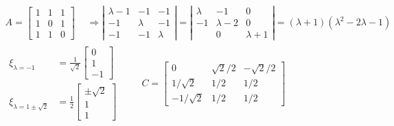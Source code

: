 \documentclass[twoside]{amsart}
\theoremstyle{plain}
\theoremstyle{definition}
\begin{document}
\[
\begin{gathered}
  A = \left[ \begin{matrix} 1 & 1 & 1 \\ 1 & 0 & 1 \\ 1 & 1 & 0 \end{matrix} \right] \quad \, \Longrightarrow \left| \begin{matrix} \lambda - 1 & -1 & -1 \\ -1 & \lambda & -1 \\ -1 & -1 & \lambda \end{matrix} \right| = \left| \begin{matrix} \lambda & -1 & 0 \\ -1 & \lambda - 2 & 0 \\ & 0 & \lambda + 1 \end{matrix} \right| = (\lambda + 1)(\lambda^2 - 2\lambda - 1) \\
  \begin{aligned}
    \xi_{\lambda = -1} & = \frac{1}{\sqrt{2}} \left[ \begin{matrix} 0 \\ 1 \\ -1 \end{matrix} \right] \\
    \xi_{\lambda = 1 \pm \sqrt{2}} & = \frac{1}{2} \left[ \begin{matrix} \pm \sqrt{2} \\ 1 \\ 1 \end{matrix} \right] 
  \end{aligned} \quad \quad \, 
  C = \left[ \begin{matrix} 0 & \sqrt{2}/2 & -\sqrt{2}/2 \\ 1/\sqrt{2} & 1/2 & 1/2 \\ -1/\sqrt{2} & 1/2 & 1/2 \end{matrix} \right]
\end{gathered}
\]
\end{document}
